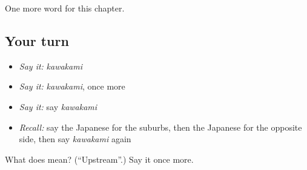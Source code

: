 \begin{grammarlens}[title={What you've built}]
One more word for this chapter.
\end{grammarlens}

\subsection*{Your turn}
\begin{itemize}
\raggedright
  \item \emph{Say it:} \emph{kawakami}
  \item \emph{Say it:} \emph{kawakami}, once more
  \item \emph{Say it:} say \emph{kawakami}
  \item \emph{Recall:} say the Japanese for the suburbs, then the Japanese for the opposite side, then say \emph{kawakami} again
\end{itemize}

\begin{tcolorbox}[breakable,colback=teal!4,colframe=teal!35!black,title={Before you move on}]
What does  mean? (\textquotedblleft{}Upstream\textquotedblright{}.) Say it once more.
\end{tcolorbox}
